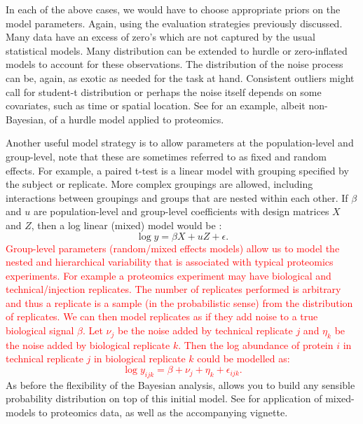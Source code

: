 \documentclass[12pt,english, journal=jpr, layout=twocolumn]{article}
\begin{document}
In each of the above cases, we would have to choose appropriate priors on the model parameters. Again, using the evaluation strategies previously discussed. Many data have an excess of zero's which are not captured by the usual statistical models. Many distribution can be extended to hurdle or zero-inflated models to account for these observations. The distribution of the noise process can be, again, as exotic as needed for the task at hand. Consistent outliers might call for student-t distribution or perhaps the noise itself depends on some covariates, such as time or spatial location. See \citet{Goeminne::2020} for an example, albeit non-Bayesian, of a hurdle model applied to proteomics.

Another useful model strategy is to allow parameters at the population-level and group-level, note that these are sometimes referred to as fixed and random effects. For example, a paired t-test is a linear model with grouping specified by the subject or replicate. More complex groupings are allowed, including interactions between groupings and groups that are nested within each other. If $\beta$ and $u$ are population-level and group-level coefficients with design matrices $X$ and $Z$, then a log linear (mixed) model would be \citep{Bates::2014}:
\begin{equation}
\log y = \beta X + u Z + \epsilon.
\end{equation}
\textcolor{red}{Group-level parameters (random/mixed effects models) allow us to model the nested and hierarchical variability that is associated with typical proteomics experiments. For example a proteomics experiment may have biological and technical/injection replicates. The number of replicates performed is arbitrary and thus a replicate is a sample (in the probabilistic sense) from the distribution of replicates. We can then model replicates as if they add noise to a true biological signal $\beta$. Let $\nu_j$ be the noise added by technical replicate $j$ and $\eta_k$ be the noise added by biological replicate $k$. Then the log abundance of protein $i$ in technical replicate $j$ in biological replicate $k$ could be modelled as:
\begin{equation}
\log y_{ijk} = \beta + \nu_j + \eta_k + \epsilon_{ijk}.
\end{equation}
}
As before the flexibility of the Bayesian analysis, allows you to build any sensible probability distribution on top of this initial model. See \citet{Morris::2008, Morris::2011} for application of mixed-models to proteomics data, as well as the accompanying vignette.
\end{document}
